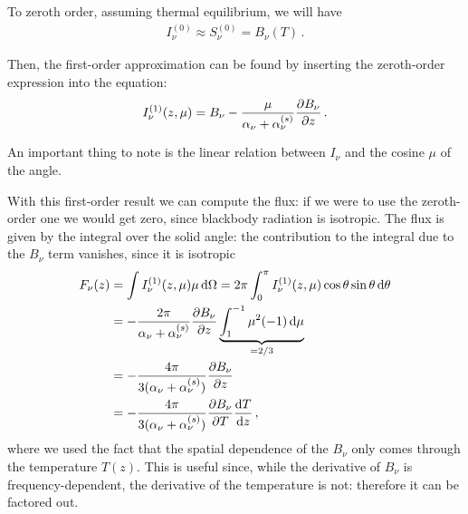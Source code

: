 \documentclass[main.tex]{subfiles}
\begin{document}
To zeroth order, assuming thermal equilibrium, we will have 
%
\begin{align}
I_\nu^{(0)} \approx S_\nu^{(0)} = B_\nu (T)
\,.
\end{align}

Then, the first-order approximation can be found by inserting the zeroth-order expression into the equation: 
%
\begin{align}
I_{\nu }^{(1)} (z, \mu ) = B_\nu - \frac{\mu }{\alpha_{\nu } + \alpha_{\nu }^{(s)}} \pdv{B_\nu }{z} 
\,.
\end{align}

An important thing to note is the linear relation between \(I_\nu \) and the cosine \(\mu \) of the angle. 

With this first-order result we can compute the flux: if we were to use the zeroth-order one we would get zero, since blackbody radiation is isotropic. 
The flux is given by the integral over the solid angle: the contribution to the integral due to the \(B_\nu \) term vanishes, since it is isotropic
%
\begin{align}
F_{\nu }(z) &= \int I_\nu^{(1)} (z, \mu ) \mu \dd{\Omega }
= 2 \pi \int_0^{\pi } I_\nu^{(1)} (z, \mu ) \cos \theta \sin \theta \dd{\theta }  \\
&= - \frac{2 \pi }{\alpha_{\nu } + \alpha_{\nu }^{(s)}} \pdv{B_\nu }{z} 
\underbrace{\int_{1}^{-1}  \mu^2  (-1) \dd{\mu }}_{= 2/3}  \\
&= - \frac{4 \pi }{3 (\alpha_{\nu } + \alpha_{\nu }^{(s)})} \pdv{B_\nu }{z}  \\
&= - \frac{4 \pi }{3 (\alpha_{\nu } + \alpha_{\nu }^{(s)})} \pdv{B_\nu }{T} \dv{T}{z} 
\,,
\end{align}
%
where we used the fact that the spatial dependence of the \(B_\nu \) only comes through the temperature \(T(z)\). This is useful since, while the derivative of \(B_\nu \) is frequency-dependent, the derivative of the temperature is not: therefore it can be factored out. 
\end{document}

